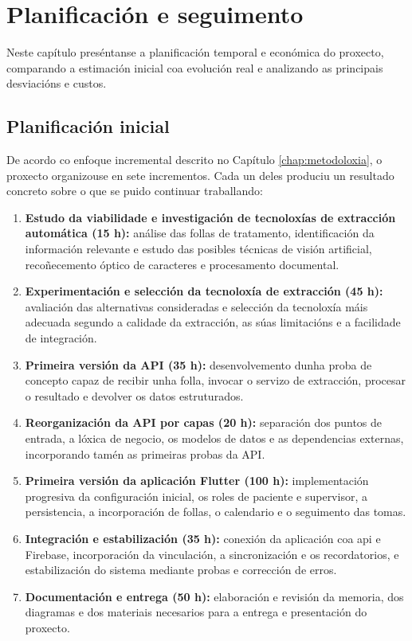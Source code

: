 \chapter{Planificación e seguimento}
\label{chap:planificacion}

Neste capítulo preséntanse a planificación temporal e económica do proxecto, comparando a estimación inicial coa evolución real e analizando as principais desviacións e custos.

\section{Planificación inicial}
De acordo co enfoque incremental descrito no Capítulo \ref{chap:metodoloxia}, o proxecto organizouse en sete incrementos. Cada un deles produciu un resultado concreto sobre o que se puido continuar traballando:

\begin{enumerate}
    \item \textbf{Estudo da viabilidade e investigación de tecnoloxías de extracción automática (15 h):}
    análise das follas de tratamento, identificación da información relevante e estudo das posibles técnicas de visión artificial, recoñecemento óptico de caracteres e procesamento documental.

    \item \textbf{Experimentación e selección da tecnoloxía de extracción (45 h):}
    avaliación das alternativas consideradas e selección da tecnoloxía máis adecuada segundo a calidade da extracción, as súas limitacións e a facilidade de integración.

    \item \textbf{Primeira versión da API (35 h):}
    desenvolvemento dunha proba de concepto capaz de recibir unha folla, invocar o servizo de extracción, procesar o resultado e devolver os datos estruturados.

    \item \textbf{Reorganización da API por capas (20 h):}
    separación dos puntos de entrada, a lóxica de negocio, os modelos de datos e as dependencias externas, incorporando tamén as primeiras probas da API.

    \item \textbf{Primeira versión da aplicación Flutter (100 h):}
    implementación progresiva da configuración inicial, os roles de paciente e supervisor, a persistencia, a incorporación de follas, o calendario e o seguimento das tomas.

    \item \textbf{Integración e estabilización (35 h):}
    conexión da aplicación coa \gls{api} e Firebase, incorporación da vinculación, a sincronización e os recordatorios, e estabilización do sistema mediante probas e corrección de erros.

    \item \textbf{Documentación e entrega (50 h):}
    elaboración e revisión da memoria, dos diagramas e dos materiais necesarios para a entrega e presentación do proxecto.
\end{enumerate}

